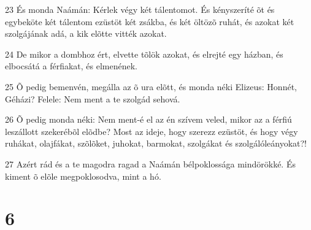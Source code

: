 \par 23 És monda Naámán: Kérlek végy két tálentomot. És kényszeríté õt és egybeköte két tálentom ezüstöt két zsákba, és két öltözõ ruhát, és azokat két szolgájának adá, a kik elõtte vitték azokat.
\par 24 De mikor a dombhoz ért, elvette tõlök azokat, és elrejté egy házban, és elbocsátá a férfiakat, és elmenének.
\par 25 Õ pedig bemenvén, megálla az õ ura elõtt, és monda néki Elizeus: Honnét, Géházi? Felele: Nem ment a te szolgád sehová.
\par 26 Õ pedig monda néki: Nem ment-é el az én szívem veled, mikor az a férfiú leszállott szekerébõl elõdbe? Most az ideje, hogy szerezz ezüstöt, és hogy végy ruhákat, olajfákat, szõlõket, juhokat, barmokat, szolgákat és szolgálóleányokat?!
\par 27 Azért rád és a te magodra ragad a Naámán bélpoklossága mindörökké. És kiment õ elõle megpoklosodva, mint a hó.

\chapter{6}

